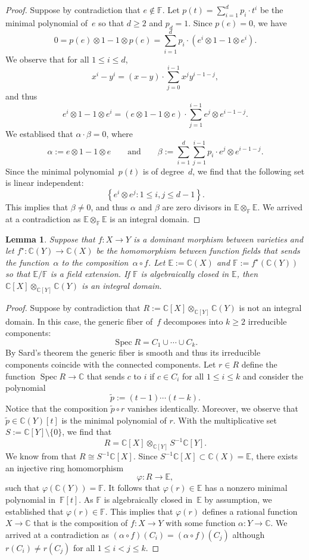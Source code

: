 \documentclass[12pt]{article}
\newtheorem{lemma}{Lemma}
\theoremstyle{definition}
\newcommand{\st}{such that }
\renewcommand{\c}{\colon}
\newcommand{\set}[2]{\left\{#1:#2\right\}}
\newcommand{\C}{{\mathbb{C}}}
\newcommand{\F}{{\mathbb{F}}}
\newcommand{\E}{{\mathbb{E}}}
\newcommand{\Spec}{\operatorname{Spec}}
\begin{document}
\begin{proof}
Suppose by contradiction that $e\notin \F$.
Let $p(t)=\sum^d_{i=1}p_i\cdot t^i$
be the minimal polynomial of~$e$
so that $d\geq 2$ and $p_d=1$.
Since $p(e)=0$, we have
\[
0=p(e)\otimes 1-1\otimes p(e)=\sum^d_{i=1}p_i\cdot\left(e^i\otimes 1-1\otimes e^i\right).
\]
We observe that for all $1\leq i\leq d$,
\[
x^i-y^i=(x-y)\cdot\sum_{j=0}^{i-1}x^jy^{i-1-j},
\]
and thus
\[
e^i\otimes 1-1\otimes e^i=(e\otimes 1-1\otimes e)\cdot \sum_{j=1}^{i-1} e^j\otimes e^{i-1-j}.
\]
We establised that $\alpha\cdot\beta=0$, where
\[
\alpha:=e\otimes 1-1\otimes e
\qquad\text{and}\qquad
\beta:=\sum^d_{i=1}\sum_{j=1}^{i-1}p_i\cdot e^j\otimes e^{i-1-j}.
\]
Since the minimal polynomial~$p(t)$ is of degree~$d$, we find that
the following set is linear independent:
\[
\set{e^i\otimes e^j}{1\leq i,j\leq d-1}.
\]
This implies that $\beta\neq 0$,
and thus $\alpha$ and $\beta$ are zero divisors in $\E\otimes_\F \E$.
We arrived at a contradiction as $\E\otimes_\F \E$ is an integral domain.
\end{proof}

\begin{lemma}
\label{lem:step3}
Suppose that $f\c X\to Y$ is a dominant morphism between varieties
and let $f^\star\c \C(Y)\to \C(X)$ be the homomorphism between function fields
that sends the function~$\alpha$ to the composition~$\alpha\circ f$.
Let $\E:=\C(X)$ and $\F:=f^\star(\C(Y))$ so that $\E/\F$ is a field extension.
If $\F$ is algebraically closed in $\E$,
then $\C[X]\otimes_{\C[Y]}\C(Y)$ is an integral domain.
\end{lemma}

\begin{proof}
Suppose by contradiction that
$R:=\C[X]\otimes_{\C[Y]}\C(Y)$ is not an integral domain.
In this case, the generic fiber of~$f$ decomposes into $k\geq 2$ irreducible components:
\[
\Spec R=C_1\cup\cdots\cup C_k.
\]
By Sard's theorem the generic fiber is smooth and thus its irreducible components coincide
with the connected components.
Let $r\in R$ define the function $\Spec R\to \C$
that sends $c$ to $i$ if $c\in C_i$ for all $1\leq i\leq k$
and consider the polynomial
\[
\tilde{p}:=(t-1)\cdots(t-k).
\]
Notice that the composition $\tilde{p}\circ r$ vanishes identically.
Moreover, we observe that $\tilde{p}\in \C(Y)[t]$ is the minimal polynomial of $r$.
With the multiplicative set~$S:=\C[Y]\setminus\{0\}$, we find that
\[
R=\C[X]\otimes_{\C[Y]}S^{-1}\C[Y].
\]
We know from  that $R\cong S^{-1}\C[X]$.
Since $S^{-1}\C[X]\subset \C(X)=\E$, there exists an injective ring homomorphism
\[
\varphi\c R \to \E,
\]
\st $\varphi(\C(Y))=\F$.
It follows that $\varphi(r)\in\E$ has a nonzero minimal polynomial in~$\F[t]$.
As $\F$ is algebraically closed in~$\E$ by assumption, we established that $\varphi(r)\in \F$.
This implies that $\varphi(r)$ defines a rational function~$X\to \C$
that is the composition of $f\c X\to Y$ with some function $\alpha\c Y\to\C$.
We arrived at a contradiction as $(\alpha\circ f)(C_i)=(\alpha\circ f)(C_j)$
although $r(C_i)\neq r(C_j)$
for all $1\leq i<j\leq k$.
\end{proof}
\end{document}
